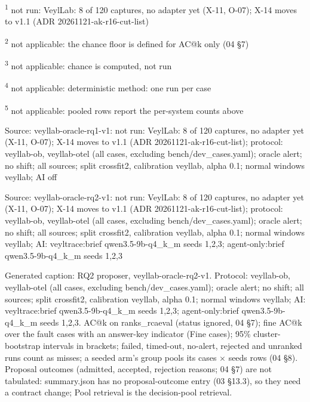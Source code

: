 \par\raggedright\noindent
\textsuperscript{1} not run: VeylLab: 8 of 120 captures, no adapter yet (X-11, O-07); X-14 moves to v1.1 (ADR 20261121-ak-r16-cut-list)\par
\textsuperscript{2} not applicable: the chance floor is defined for AC@k only (04 \S{}7)\par
\textsuperscript{3} not applicable: chance is computed, not run\par
\textsuperscript{4} not applicable: deterministic method: one run per case\par
\textsuperscript{5} not applicable: pooled rows report the per-system counts above\par
\noindent Source: veyllab-oracle-rq1-v1: not run: VeylLab: 8 of 120 captures, no adapter yet (X-11, O-07); X-14 moves to v1.1 (ADR 20261121-ak-r16-cut-list); protocol: veyllab-ob, veyllab-otel (all cases, excluding bench/\allowbreak{}dev\_cases.yaml); oracle alert; no shift; all sources; split crossfit2, calibration veyllab, alpha 0.1; normal windows veyllab; AI off\par
\noindent Source: veyllab-oracle-rq2-v1: not run: VeylLab: 8 of 120 captures, no adapter yet (X-11, O-07); X-14 moves to v1.1 (ADR 20261121-ak-r16-cut-list); protocol: veyllab-ob, veyllab-otel (all cases, excluding bench/\allowbreak{}dev\_cases.yaml); oracle alert; no shift; all sources; split crossfit2, calibration veyllab, alpha 0.1; normal windows veyllab; AI: veyltrace:brief qwen3.5-9b-q4\_k\_m seeds 1,2,3; agent-only:brief qwen3.5-9b-q4\_k\_m seeds 1,2,3\par
\noindent Generated caption: RQ2 proposer, veyllab-oracle-rq2-v1. Protocol: veyllab-ob, veyllab-otel (all cases, excluding bench/\allowbreak{}dev\_cases.yaml); oracle alert; no shift; all sources; split crossfit2, calibration veyllab, alpha 0.1; normal windows veyllab; AI: veyltrace:brief qwen3.5-9b-q4\_k\_m seeds 1,2,3; agent-only:brief qwen3.5-9b-q4\_k\_m seeds 1,2,3. AC@k on ranks\_rcaeval (status ignored, 04 \S{}7); fine AC@k over the fault cases with an answer-key indicator (Fine cases); 95\% cluster-bootstrap intervals in brackets; failed, timed-out, no-alert, rejected and unranked runs count as misses; a seeded arm's group pools its cases $\times$ seeds rows (04 \S{}8). Proposal outcomes (admitted, accepted, rejection reasons; 04 \S{}7) are not tabulated: summary.json has no proposal-outcome entry (03 \S{}13.3), so they need a contract change; Pool retrieval is the decision-pool retrieval.\par
\endgroup
